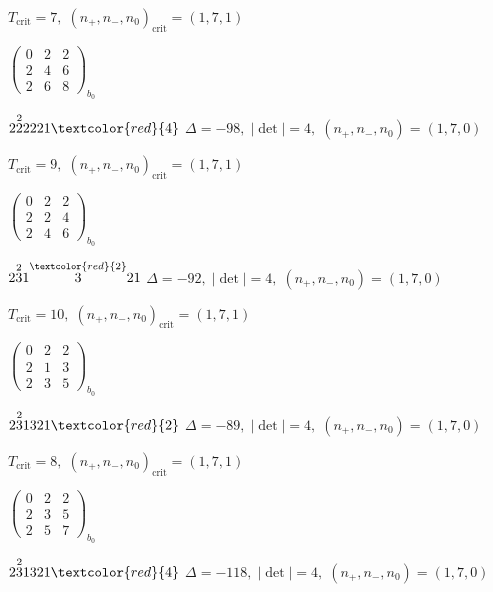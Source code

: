 \documentclass[10pt]{article}
\begin{document}
\hspace{1em}$T_{\text{crit}}=7,\; (n_+,n_-,n_0)_{\text{crit}}=(1,7,1)$

\hspace{2em}$\left(\begin{smallmatrix}0 & 2 & 2 \\ 2 & 4 & 6 \\ 2 & 6 & 8\end{smallmatrix}\right)_{\!b_0}$

$2\overset{2}{2}2221\textcolor{red}{4}$ \quad $\Delta=-98,\; |\det|=4,\; (n_+,n_-,n_0)=(1,7,0)$

\hspace{1em}$T_{\text{crit}}=9,\; (n_+,n_-,n_0)_{\text{crit}}=(1,7,1)$

\hspace{2em}$\left(\begin{smallmatrix}0 & 2 & 2 \\ 2 & 2 & 4 \\ 2 & 4 & 6\end{smallmatrix}\right)_{\!b_0}$

\smallskip

$2\overset{2}{3}1\overset{\textcolor{red}{2}}{3}21$ \quad $\Delta=-92,\; |\det|=4,\; (n_+,n_-,n_0)=(1,7,0)$

\hspace{1em}$T_{\text{crit}}=10,\; (n_+,n_-,n_0)_{\text{crit}}=(1,7,1)$

\hspace{2em}$\left(\begin{smallmatrix}0 & 2 & 2 \\ 2 & 1 & 3 \\ 2 & 3 & 5\end{smallmatrix}\right)_{\!b_0}$

$2\overset{2}{3}1321\textcolor{red}{2}$ \quad $\Delta=-89,\; |\det|=4,\; (n_+,n_-,n_0)=(1,7,0)$

\hspace{1em}$T_{\text{crit}}=8,\; (n_+,n_-,n_0)_{\text{crit}}=(1,7,1)$

\hspace{2em}$\left(\begin{smallmatrix}0 & 2 & 2 \\ 2 & 3 & 5 \\ 2 & 5 & 7\end{smallmatrix}\right)_{\!b_0}$

$2\overset{2}{3}1321\textcolor{red}{4}$ \quad $\Delta=-118,\; |\det|=4,\; (n_+,n_-,n_0)=(1,7,0)$
\end{document}
